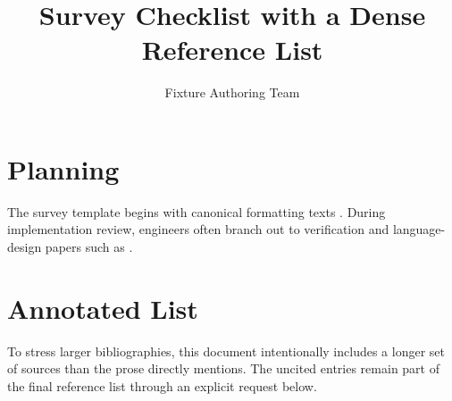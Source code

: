 \documentclass{article}
\begin{document}
\title{Survey Checklist with a Dense Reference List}
\author{Fixture Authoring Team}
\date{}
\maketitle

\section{Planning}
The survey template begins with canonical formatting texts
\cite{knuth84,lamport94,mittelbach04}. During implementation review, engineers
often branch out to verification and language-design papers such as
\cite{hoare69,milner78,aho86}.

\section{Annotated List}
To stress larger bibliographies, this document intentionally includes a longer
set of sources than the prose directly mentions. The uncited entries remain part
of the final reference list through an explicit request below.

\nocite{dijkstra68,wirth71,bentley86,shannon48,tarjan72,backus78,brooks75}
\nocite{golub96,gray93,knuth98,tukey77,chomsky57,hearn83,press92,steele90}


\end{document}
